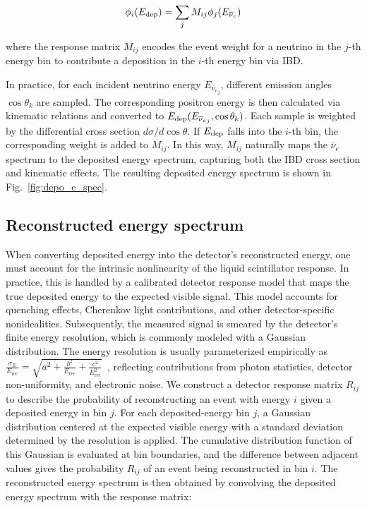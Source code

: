\documentclass[xetex,twocolumn,epjc3]{svjour3}
\begin{document}
\begin{equation}
\begin{aligned}
    \phi_i(E_{\rm dep}) = \sum_j M_{ij} \phi_j(E_{\rm {\overline{\nu}_e}})
\end{aligned}
\end{equation}

\noindent where the response matrix $M_{ij}$ encodes the event weight for a neutrino in the $j$-th energy bin to contribute a deposition in the $i$-th energy bin via IBD.

In practice, for each incident neutrino energy $E_{{\overline{\nu}_e}_j}$, different emission angles $\cos\theta_k$ are sampled. The corresponding positron energy is then calculated via kinematic relations and converted to $E_{\rm dep}(E_{{\overline{\nu}_e}_j}, \cos\theta_k)$. Each sample is weighted by the differential cross section $d\sigma/d\cos\theta$. If $E_{\rm dep}$ falls into the $i$-th bin, the corresponding weight is added to $M_{ij}$. In this way, $M_{ij}$ naturally maps the $\overline{\nu}_e$ spectrum to the deposited energy spectrum, capturing both the IBD cross section and kinematic effects. The resulting deposited energy spectrum is shown in Fig.~\ref{fig:depo_e_spec}.

\subsection{Reconstructed energy spectrum}
\label{sec:Reconstructed energy spectrum}
When converting deposited energy into the detector’s reconstructed energy, one must account for the intrinsic nonlinearity of the liquid scintillator response. In practice, this is handled by a calibrated detector response model that maps the true deposited energy to the expected visible signal. This model accounts for quenching effects, Cherenkov light contributions, and other detector-specific nonidealities.
Subsequently, the measured signal is smeared by the detector’s finite energy resolution, which is commonly modeled with a Gaussian distribution. The energy resolution is usually parameterized empirically as
$\frac{\sigma_E}{E_{\mathrm{rec}}}=\sqrt{a^2+\frac{b^2}{E_{\mathrm{rec}}}+\frac{c^2}{E_{\mathrm{rec}}^2}}$~\cite{An2021Unfolding}, reflecting contributions from photon statistics, detector non-uniformity, and electronic noise.
We construct a detector response matrix $R_{ij}$ to describe the probability of reconstructing an event with energy $i$ given a deposited energy in bin $j$. For each deposited-energy bin $j$, a Gaussian distribution centered at the expected visible energy with a standard deviation determined by the resolution is applied. The cumulative distribution function of this Gaussian is evaluated at bin boundaries, and the difference between adjacent values gives the probability $R_{ij}$ of an event being reconstructed in bin $i$. The reconstructed energy spectrum is then obtained by convolving the deposited energy spectrum with the response matrix:
\end{document}
